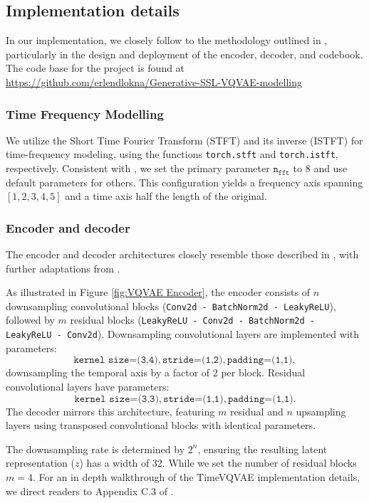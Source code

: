 \documentclass[../../thesis.tex]{subfiles}
\begin{document}
\subsection{Implementation details}

In our implementation, we closely follow to the methodology outlined in \cite{TimeVQVAE}, particularly in the design and deployment of the encoder, decoder, and codebook. The code base for the project is found at \url{https://github.com/erlendlokna/Generative-SSL-VQVAE-modelling}

\subsubsection{Time Frequency Modelling}
We utilize the Short Time Fourier Transform (STFT) and its inverse (ISTFT) for time-frequency modeling, using the functions \texttt{torch.stft} and \texttt{torch.istft}, respectively. Consistent with \cite{TimeVQVAE}, we set the primary parameter $\texttt{n}_{\texttt{fft}}$ to 8 and use default parameters for others. This configuration yields a frequency axis spanning $[1, 2, 3, 4, 5]$ and a time axis half the length of the original.

\subsubsection{Encoder and decoder}

The encoder and decoder architectures closely resemble those described in \cite{nadavbh12}, with further adaptations from \cite{TimeVQVAE}.\newline

As illustrated in Figure \ref{fig:VQVAE Encoder}, the encoder consists of $n$ downsampling convolutional blocks (\texttt{Conv2d - BatchNorm2d - LeakyReLU}), followed by $m$ residual blocks (\texttt{LeakyReLU - Conv2d - BatchNorm2d - LeakyReLU - Conv2d}). Downsampling convolutional layers are implemented with parameters: 
\[\texttt{kernel size=(3,4)}, \texttt{stride=(1,2)}, \texttt{padding=(1,1)},\] downsampling the temporal axis by a factor of 2 per block. Residual convolutional layers have parameters: 
\[\texttt{kernel size=(3,3)},\texttt{stride=(1,1)}, \texttt{padding=(1,1)}.\]
The decoder mirrors this architecture, featuring $m$ residual and $n$ upsampling layers using transposed convolutional blocks with identical parameters.\newline

The downsampling rate is determined by $2^n$, ensuring the resulting latent representation ($z$) has a width of 32. While we set the number of residual blocks $m = 4$. For an in depth walkthrough of the TimeVQVAE implementation details, we direct readers to Appendix C.3 of \cite{TimeVQVAE}.\newline
\end{document}
